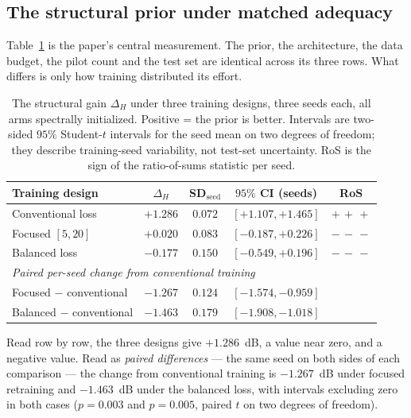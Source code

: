 \documentclass[journal]{IEEEtran}
\begin{document}
\subsection{The structural prior under matched adequacy}
\label{sec:prior}

Table~\ref{tab:designs} is the paper's central measurement. The prior, the
architecture, the data budget, the pilot count and the test set are identical
across its three rows. What differs is only how training distributed its
effort.

\begin{table}[!t]
\caption{The structural gain $\Delta_H$ under three training designs, three
seeds each, all arms spectrally initialized. Positive = the prior is better.
Intervals are two-sided $95\%$ Student-$t$ intervals for the seed mean on two
degrees of freedom; they describe training-seed variability, not test-set
uncertainty. RoS is the sign of the ratio-of-sums statistic per seed.}
\label{tab:designs}
\centering
\footnotesize
\setlength{\tabcolsep}{3pt}
\begin{tabular}{lcccc}
\toprule
Training design & $\Delta_H$ & SD$_\text{seed}$ & $95\%$ CI (seeds) & RoS \\
\midrule
Conventional loss & $\mathbf{+1.286}$ & $0.072$ & $[+1.107,+1.465]$ &
$+\,+\,+$ \\
Focused $[5,20]$ & $+0.020$ & $0.083$ & $[-0.187,+0.226]$ & $-\,-\,-$ \\
Balanced loss & $-0.177$ & $0.150$ & $[-0.549,+0.196]$ & $-\,-\,-$ \\
\midrule
\multicolumn{5}{l}{\emph{Paired per-seed change from conventional training}}\\
Focused $-$ conventional & $\mathbf{-1.267}$ & $0.124$ & $[-1.574,-0.959]$ & \\
Balanced $-$ conventional & $\mathbf{-1.463}$ & $0.179$ & $[-1.908,-1.018]$ & \\
\bottomrule
\end{tabular}
\end{table}

Read row by row, the three designs give $+1.286$~dB, a value near zero, and a
negative value. Read as \emph{paired differences} --- the same seed on both
sides of each comparison --- the change from conventional training is
$-1.267$~dB under focused retraining and $-1.463$~dB under the balanced loss,
with intervals excluding zero in both cases ($p=0.003$ and $p=0.005$, paired
$t$ on two degrees of freedom).
\end{document}
